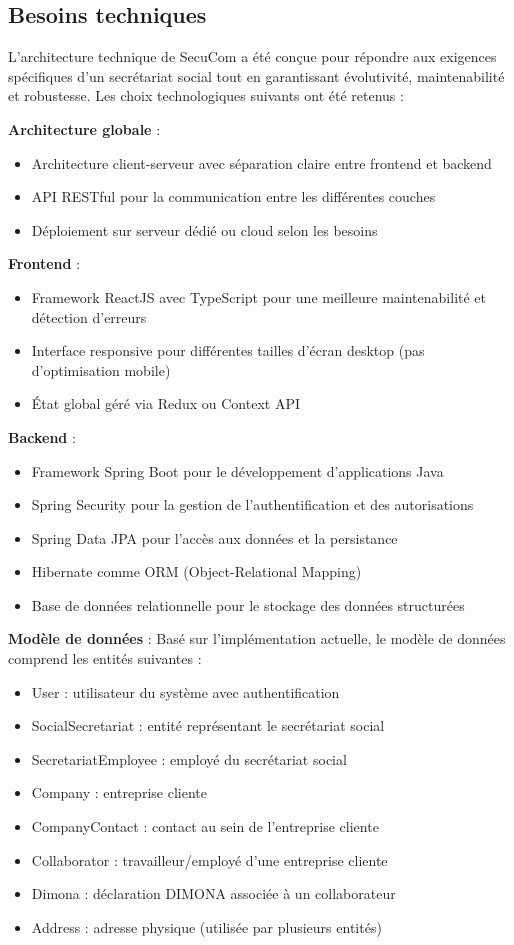 \subsection{Besoins techniques}

L'architecture technique de SecuCom a été conçue pour répondre aux exigences spécifiques d'un secrétariat social tout en garantissant évolutivité, maintenabilité et robustesse. Les choix technologiques suivants ont été retenus :

\textbf{Architecture globale} :
\begin{itemize}
  \item Architecture client-serveur avec séparation claire entre frontend et backend
  \item API RESTful pour la communication entre les différentes couches
  \item Déploiement sur serveur dédié ou cloud selon les besoins
\end{itemize}

\textbf{Frontend} :
\begin{itemize}
  \item Framework ReactJS avec TypeScript pour une meilleure maintenabilité et détection d'erreurs
  \item Interface responsive pour différentes tailles d'écran desktop (pas d'optimisation mobile)
  \item État global géré via Redux ou Context API
\end{itemize}

\textbf{Backend} :
\begin{itemize}
  \item Framework Spring Boot pour le développement d'applications Java
  \item Spring Security pour la gestion de l'authentification et des autorisations
  \item Spring Data JPA pour l'accès aux données et la persistance
  \item Hibernate comme ORM (Object-Relational Mapping)
  \item Base de données relationnelle pour le stockage des données structurées
\end{itemize}

\textbf{Modèle de données} :
Basé sur l'implémentation actuelle, le modèle de données comprend les entités suivantes :
\begin{itemize}
  \item User : utilisateur du système avec authentification
  \item SocialSecretariat : entité représentant le secrétariat social
  \item SecretariatEmployee : employé du secrétariat social
  \item Company : entreprise cliente
  \item CompanyContact : contact au sein de l'entreprise cliente
  \item Collaborator : travailleur/employé d'une entreprise cliente
  \item Dimona : déclaration DIMONA associée à un collaborateur
  \item Address : adresse physique (utilisée par plusieurs entités)
\end{itemize}

